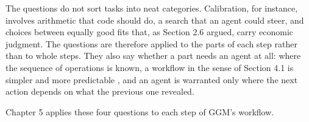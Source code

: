 The questions do not sort tasks into neat categories.
Calibration, for instance, involves arithmetic that code should do, a search that an agent could steer, and choices between equally good fits that, as Section 2.6 argued, carry economic judgment.
The questions are therefore applied to the parts of each step rather than to whole steps.
They also say whether a part needs an agent at all: where the sequence of operations is known, a workflow in the sense of Section 4.1 is simpler and more predictable \citep{schluntz2024building}, and an agent is warranted only where the next action depends on what the previous one revealed.

Chapter 5 applies these four questions to each step of GGM's workflow.
